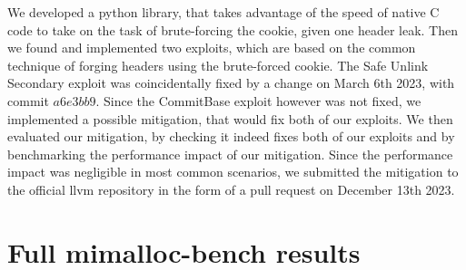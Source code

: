 \documentclass[a4paper,11pt,oneside]{report}
\begin{document}
We developed a python library, that takes advantage of the speed of native C code to take
on the task of brute-forcing the cookie, given one header leak. Then we found and
implemented two exploits, which are based on the common technique of forging headers using
the brute-forced cookie.
The Safe Unlink Secondary exploit was coincidentally fixed by a change on March 6th 2023,
with commit $a6e3bb9$. Since the CommitBase exploit however was not fixed, we implemented
a possible mitigation, that would fix both of our exploits. We then evaluated our
mitigation, by checking it indeed fixes both of our exploits and by benchmarking the
performance impact of our mitigation. Since the performance impact was negligible in most
common scenarios, we submitted the mitigation to the official llvm repository in the form
of a pull request on December 13th 2023.


\cleardoublepage{}
\printbibliography{}

\appendix
\chapter{Full mimalloc-bench results}
\end{document}
